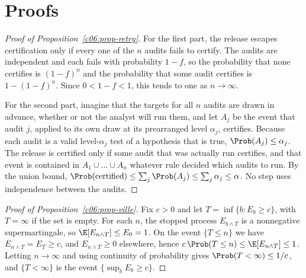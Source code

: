 \section{Proofs}\label{c06:sec-proofs}

\begin{proof}[Proof of Proposition~\ref{c06:prop-retry}]
For the first part, the release escapes certification only if every one of the $n$
audits fails to certify. The audits are independent and each fails with
probability $1-f$, so the probability that none certifies is $(1-f)^n$ and the
probability that some audit certifies is $1-(1-f)^n$. Since $0 < 1-f < 1$, this
tends to one as $n \to \infty$.

For the second part, imagine that the targets for all $n$ audits are drawn in
advance, whether or not the analyst will run them, and let $A_j$ be the event that
audit $j$, applied to its own draw at its prearranged level $\alpha_j$, certifies.
Because each audit is a valid level-$\alpha_j$ test of a hypothesis that is true,
$\Prob(A_j) \le \alpha_j$. The release is certified only if some audit that was
actually run certifies, and that event is contained in $A_1 \cup \dots \cup A_n$
whatever rule decided which audits to run. By the union bound,
$\Prob(\text{certified}) \le \sum_j \Prob(A_j) \le \sum_j \alpha_j \le \alpha$. No
step uses independence between the audits.
\end{proof}

\begin{proof}[Proof of Proposition~\ref{c06:prop-ville}]
Fix $c > 0$ and let $T = \inf\{b : E_b \ge c\}$, with $T = \infty$ if the set is
empty. For each $n$, the stopped process $E_{b \wedge T}$ is a nonnegative
supermartingale, so $\E[E_{n \wedge T}] \le E_0 = 1$. On the event $\{T \le n\}$ we
have $E_{n \wedge T} = E_T \ge c$, and $E_{n \wedge T} \ge 0$ elsewhere, hence
$c\,\Prob(T \le n) \le \E[E_{n \wedge T}] \le 1$. Letting $n \to \infty$ and using
continuity of probability gives $\Prob(T < \infty) \le 1/c$, and $\{T < \infty\}$
is the event $\{\sup_b E_b \ge c\}$.
\end{proof}

